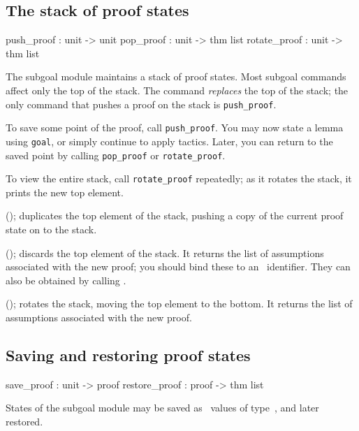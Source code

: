 \subsection{The stack of proof states}
\begin{ttbox} 
push_proof   : unit -> unit
pop_proof    : unit -> thm list
rotate_proof : unit -> thm list
\end{ttbox}
The subgoal module maintains a stack of proof states.  Most subgoal
commands affect only the top of the stack.  The  command {\em
replaces\/} the top of the stack; the only command that pushes a proof on the
stack is \texttt{push_proof}.

To save some point of the proof, call \texttt{push_proof}.  You may now
state a lemma using \texttt{goal}, or simply continue to apply tactics.
Later, you can return to the saved point by calling \texttt{pop_proof} or 
\texttt{rotate_proof}. 

To view the entire stack, call \texttt{rotate_proof} repeatedly; as it rotates
the stack, it prints the new top element.

\begin{ttdescription}
\item[\ttindexbold{push_proof}();]  
duplicates the top element of the stack, pushing a copy of the current
proof state on to the stack.

\item[\ttindexbold{pop_proof}();]  
discards the top element of the stack.  It returns the list of
assumptions associated with the new proof;  you should bind these to an
\ML\ identifier.  They can also be obtained by calling .

\item[\ttindexbold{rotate_proof}();]
rotates the stack, moving the top element to the bottom.  It returns the
list of assumptions associated with the new proof.
\end{ttdescription}


\subsection{Saving and restoring proof states}
\begin{ttbox} 
save_proof    : unit -> proof
restore_proof : proof -> thm list
\end{ttbox}
States of the subgoal module may be saved as \ML\ values of
type~, and later restored.


